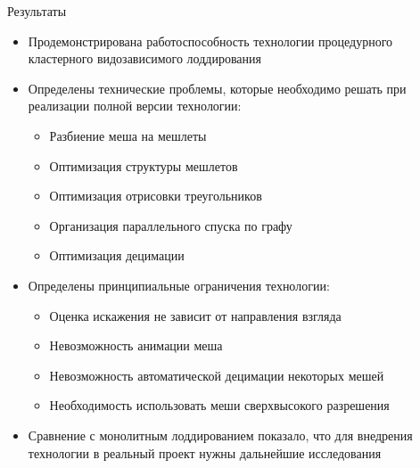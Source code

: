 \begin{frame}{Результаты}
    \begin{itemize}
        \item Продемонстрирована работоспособность технологии процедурного кластерного видозависимого лоддирования
        \item Определены технические проблемы, которые необходимо решать при реализации полной версии технологии:
        \begin{itemize}
            \item Разбиение меша на мешлеты
            \item Оптимизация структуры мешлетов
            \item Оптимизация отрисовки треугольников
            \item Организация параллельного спуска по графу
            \item Оптимизация децимации
        \end{itemize}
        \item Определены принципиальные ограничения технологии:
        \begin{itemize}
            \item Оценка искажения не зависит от направления взгляда
            \item Невозможность анимации меша
            \item Невозможность автоматической децимации некоторых мешей
            \item Необходимость использовать меши сверхвысокого разрешения
        \end{itemize}
        \item Сравнение с монолитным лоддированием показало, что для внедрения технологии в реальный проект нужны дальнейшие исследования
    \end{itemize}
\end{frame}
